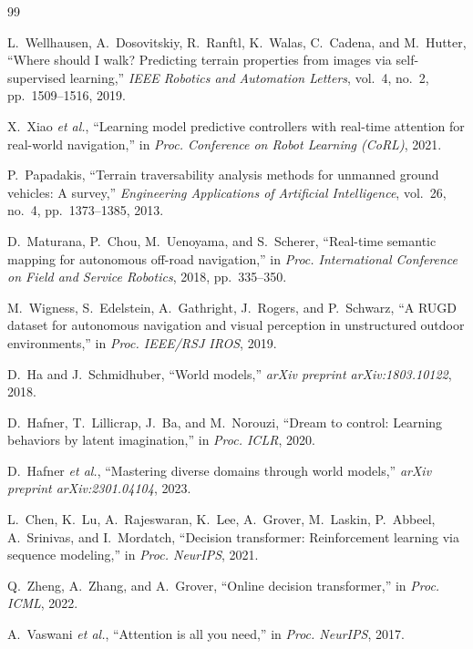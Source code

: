 \documentclass[journal]{IEEEtran}
\begin{document}
\begin{thebibliography}{99}

L.~Wellhausen, A.~Dosovitskiy, R.~Ranftl, K.~Walas, C.~Cadena, and M.~Hutter, ``Where should I walk? Predicting terrain properties from images via self-supervised learning,'' \textit{IEEE Robotics and Automation Letters}, vol.~4, no.~2, pp.~1509--1516, 2019.

X.~Xiao \textit{et al.}, ``Learning model predictive controllers with real-time attention for real-world navigation,'' in \textit{Proc. Conference on Robot Learning (CoRL)}, 2021.

P.~Papadakis, ``Terrain traversability analysis methods for unmanned ground vehicles: A survey,'' \textit{Engineering Applications of Artificial Intelligence}, vol.~26, no.~4, pp.~1373--1385, 2013.

D.~Maturana, P.~Chou, M.~Uenoyama, and S.~Scherer, ``Real-time semantic mapping for autonomous off-road navigation,'' in \textit{Proc. International Conference on Field and Service Robotics}, 2018, pp.~335--350.

M.~Wigness, S.~Edelstein, A.~Gathright, J.~Rogers, and P.~Schwarz, ``A RUGD dataset for autonomous navigation and visual perception in unstructured outdoor environments,'' in \textit{Proc. IEEE/RSJ IROS}, 2019.

D.~Ha and J.~Schmidhuber, ``World models,'' \textit{arXiv preprint arXiv:1803.10122}, 2018.

D.~Hafner, T.~Lillicrap, J.~Ba, and M.~Norouzi, ``Dream to control: Learning behaviors by latent imagination,'' in \textit{Proc. ICLR}, 2020.

D.~Hafner \textit{et al.}, ``Mastering diverse domains through world models,'' \textit{arXiv preprint arXiv:2301.04104}, 2023.

L.~Chen, K.~Lu, A.~Rajeswaran, K.~Lee, A.~Grover, M.~Laskin, P.~Abbeel, A.~Srinivas, and I.~Mordatch, ``Decision transformer: Reinforcement learning via sequence modeling,'' in \textit{Proc. NeurIPS}, 2021.

Q.~Zheng, A.~Zhang, and A.~Grover, ``Online decision transformer,'' in \textit{Proc. ICML}, 2022.

A.~Vaswani \textit{et al.}, ``Attention is all you need,'' in \textit{Proc. NeurIPS}, 2017.


\end{thebibliography}
\end{document}
